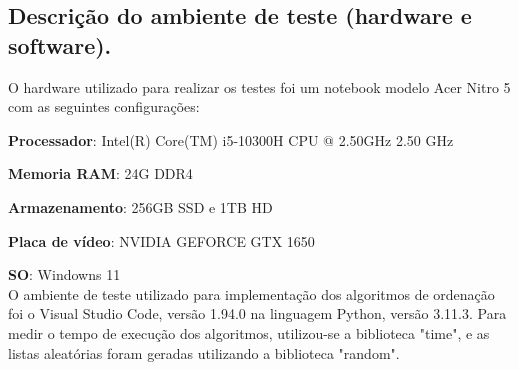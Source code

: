 \documentclass[a4paper,12pt]{article}
\begin{document}
\subsection{Descrição do ambiente de teste (hardware e software).}
O hardware utilizado para realizar os testes foi um notebook modelo Acer Nitro 5 com as seguintes configurações:

\textbf{Processador}: Intel(R) Core(TM) i5-10300H CPU @ 2.50GHz   2.50 GHz

\textbf{Memoria RAM}: 24G DDR4

\textbf{Armazenamento}: 256GB SSD e 1TB HD

\textbf{Placa de vídeo}: NVIDIA GEFORCE GTX 1650

\textbf{SO}: Windowns 11 \\
O ambiente de teste utilizado para implementação dos algoritmos de ordenação foi o Visual Studio Code, versão 1.94.0 na linguagem Python, versão 3.11.3. Para medir o tempo de execução dos algoritmos, utilizou-se a biblioteca "time", e as listas aleatórias foram geradas utilizando a biblioteca "random".
\end{document}
